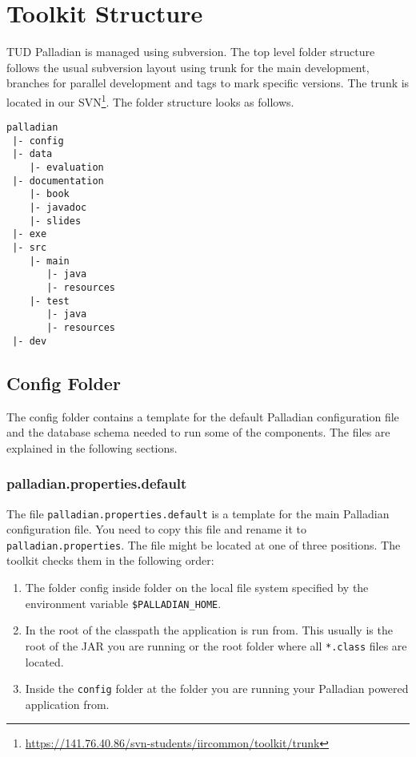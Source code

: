 \chapter{Toolkit Structure}
\label{sec:toolkitstructure}
TUD Palladian is managed using subversion. The top level folder structure follows the usual subversion layout using trunk for the main development, branches for parallel development and tags to mark specific versions. The trunk is located in our SVN\footnote{\url{https://141.76.40.86/svn-students/iircommon/toolkit/trunk}}. The folder structure looks as follows.
\begin{verbatim}
palladian
 |- config
 |- data
    |- evaluation
 |- documentation
    |- book
    |- javadoc
    |- slides
 |- exe
 |- src
    |- main
       |- java
       |- resources
    |- test
       |- java
       |- resources
 |- dev
\end{verbatim}

\section{Config Folder}
\label{sec:config.conf}
The config folder contains a template for the default Palladian configuration file and the database schema needed to run some of the components. The files are explained in the following sections.

\subsection{palladian.properties.default}
\label{sec:palladian.properties.default}
The file \texttt{palladian.properties.default} is a template for the main Palladian configuration file. You need to copy this file and rename it to \texttt{palladian.properties}. The file might be located at one of three positions. The toolkit checks them in the following order:
\begin{enumerate}
\item The folder config inside folder on the local file system specified by the environment variable \texttt{\$PALLADIAN\_HOME}.
\item In the root of the classpath the application is run from. This usually is the root of the JAR you are running or the root folder where all \texttt{*.class} files are located.
\item Inside the \texttt{config} folder at the folder you are running your Palladian powered application from.
\end{enumerate}

